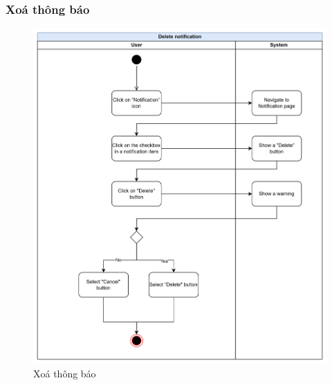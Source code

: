 \subsubsection{Xoá thông báo}
    \begin{figure}[H]
        \centering
        \includegraphics[width=\linewidth]{Content/Phân tích và thiết kế hệ thống/documents/Sơ đồ hoạt động/images/deleteNotification.png}
        \vspace{0.5cm}
        \caption{Xoá thông báo}
        \label{fig:Xoá thông báo}
    \end{figure}